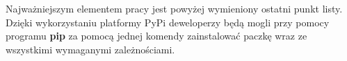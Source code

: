 \quad Najważniejszym elementem pracy jest powyżej wymieniony ostatni punkt listy. Dzięki wykorzystaniu platformy PyPi deweloperzy będą mogli przy pomocy programu \textbf{pip} za pomocą jednej komendy zainstalować paczkę wraz ze wszystkimi wymaganymi zależnościami. 



